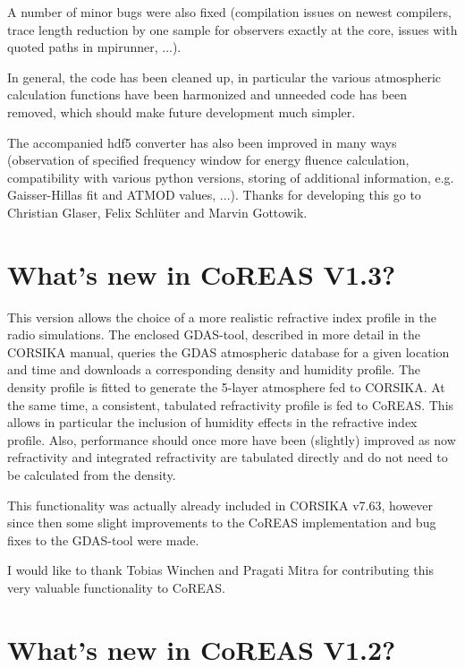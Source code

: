 \documentclass[a4paper,10pt]{article}
\begin{document}
A number of minor bugs were also fixed (compilation issues on newest compilers, trace length reduction by one sample for observers exactly at the core, issues with quoted paths in mpirunner, ...).

In general, the code has been cleaned up, in particular the various atmospheric calculation functions have been harmonized and unneeded code has been removed, which should make future development much simpler.

The accompanied hdf5 converter has also been improved in many ways (observation of specified frequency window for energy fluence calculation, compatibility with various python versions, storing of additional information, e.g. Gaisser-Hillas fit and ATMOD values, ...). Thanks for developing this go to Christian Glaser, Felix Schl\"uter and Marvin Gottowik.

\section{What's new in CoREAS V1.3?}

This version allows the choice of a more realistic refractive index profile in the radio simulations. The enclosed GDAS-tool, described in more detail in the CORSIKA manual, queries the GDAS atmospheric database for a given location and time and downloads a corresponding density and humidity profile. The density profile is fitted to generate the 5-layer atmosphere fed to CORSIKA. At the same time, a consistent, tabulated refractivity profile is fed to CoREAS. This allows in particular the inclusion of humidity effects in the refractive index profile. Also, performance should once more have been (slightly) improved as now refractivity and integrated refractivity are tabulated directly and do not need to be calculated from the density.

This functionality was actually already included in CORSIKA v7.63, however since then some slight improvements to the CoREAS implementation and bug fixes to the GDAS-tool were made.

I would like to thank Tobias Winchen and Pragati Mitra for contributing this very valuable functionality to CoREAS.

\section{What's new in CoREAS V1.2?}
\end{document}
